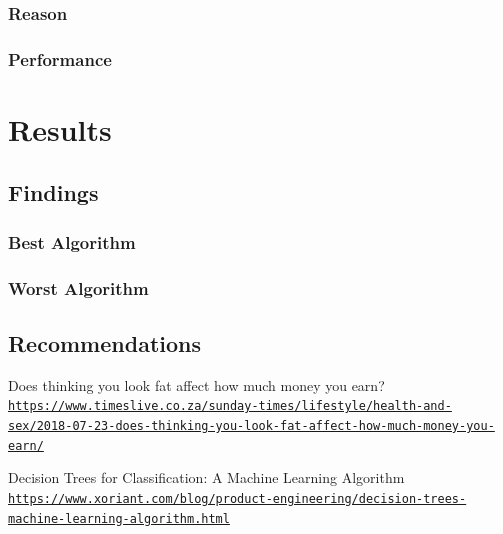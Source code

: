 \documentclass[12pt]{article}
\begin{document}
	\subsubsection{Reason}
	\subsubsection{Performance}
	\newpage
	
	
	
	\section{Results}
	\subsection{Findings}
	\subsubsection{Best Algorithm}
	\subsubsection{Worst Algorithm}
	\subsection{Recommendations}
	\newpage
	
	\begin{thebibliography}{9}
		Does thinking you look fat affect how much money you earn?
		\\\texttt{\url{https://www.timeslive.co.za/sunday-times/lifestyle/health-and-sex/2018-07-23-does-thinking-you-look-fat-affect-how-much-money-you-earn/}}
		
		Decision Trees for Classification: A Machine Learning Algorithm
		\\\texttt{\url{https://www.xoriant.com/blog/product-engineering/decision-trees-machine-learning-algorithm.html}}
	\end{thebibliography}
	
\end{document}
